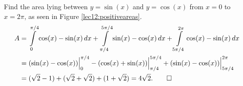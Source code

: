\begin{example}
	Find the area lying between $y = \sin(x)$ and $y = \cos(x)$ from $x = 0$ to $x = 2 \pi$, as seen in Figure \ref{lec12:positiveareas}.
	\begin{align*}
		A & = \int\limits_0^{\pi/4} \cos(x) - \sin(x) \, d x + \int\limits_{\pi/4}^{5 \pi/4} \sin(x) - \cos(x) \, d x + \int\limits_{5 \pi/4}^{2\pi} \cos(x) - \sin(x) \, d x \\
		  & = (\sin(x) - \cos(x)) \Big \rvert_0^{\pi/4} - (\cos(x) + \sin(x)) \Big \rvert_{\pi/4}^{5 \pi/4} + (\sin(x) - \cos(x)) \Big \rvert_{5\pi/4}^{2\pi}                 \\
		  & = (\sqrt{2} - 1) + (\sqrt{2} + \sqrt{2}) + (1 + \sqrt{2}) = 4 \sqrt{2}. \qedhere
	\end{align*}
\end{example}
